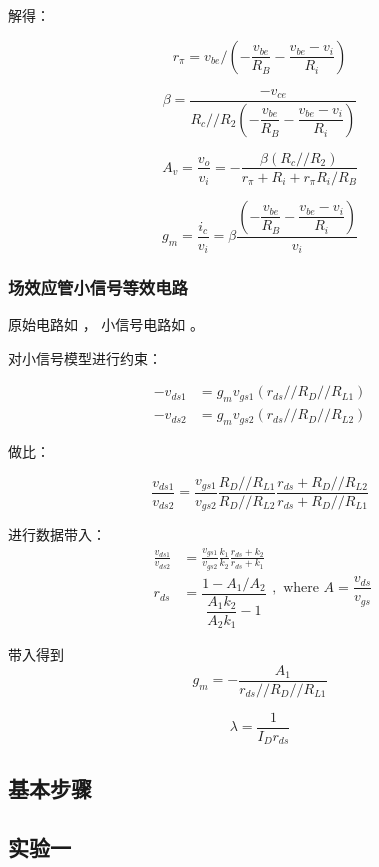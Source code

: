 \documentclass[lang=cn,11pt,a4paper,cite=authoryear]{elegantpaper}
\begin{document}
解得：

\[r_\pi = v_{be} / (-\dfrac{v_{be}}{R_B} - \dfrac{v_{be} - v_i}{R_i}) \] 

\[\beta = \dfrac{-v_{ce}}{R_c // R_2 (-\dfrac{v_{be}}{R_B} - \dfrac{v_{be} - v_i}{R_i})}\]

\[A_v = \dfrac{v_o}{v_i} = - \dfrac{\beta (R_c // R_2)}{r_\pi + R_i + r_\pi R_i / R_B}\]

\[g_m = \dfrac{i_c}{v_i} = \beta \dfrac{(-\dfrac{v_{be}}{R_B} - \dfrac{v_{be} - v_i}{R_i})}{v_i}\]


\subsubsection{场效应管小信号等效电路}

原始电路如 ， 小信号电路如  。




对小信号模型进行约束： 

\[\begin{aligned}
    - v_{ds1} &= g_m v_{gs1} (r_{ds} // R_D // R_{L1}) \\ 
    - v_{ds2} &= g_m v_{gs2} (r_{ds} // R_D // R_{L2}) 
\end{aligned}\]

做比： 

\[\frac{v_{ds1}}{v_{ds2}} = \frac{v_{gs1}}{v_{gs2}} \frac{R_D // R_{L1}}{R_D // R_{L2}} \frac{r_{ds} + R_D // R_{L2}}{r_{ds} + R_D // R_{L1}}\]

进行数据带入： \[\begin{aligned}
    \frac{v_{ds1}}{v_{ds2}} &= \frac{v_{gs1}}{v_{gs2}} \frac{k_1}{k_2} \frac{r_{ds} + k_2}{r_{ds} + k_1} \\
    r_{ds} &= \dfrac{1-A_1/A_2}{\dfrac{A_1 k_2}{A_2 k_1} - 1}
\end{aligned}, \text{ where } A = \frac{v_{ds}}{v_{gs}}\]

带入得到 \[g_m = - \frac{A_1}{r_{ds} // R_D // R_{L1}}\]  

\[\lambda = \frac{1}{I_D r_{ds}}\]

\subsection{基本步骤}

\subsection{实验一} 
\end{document}
